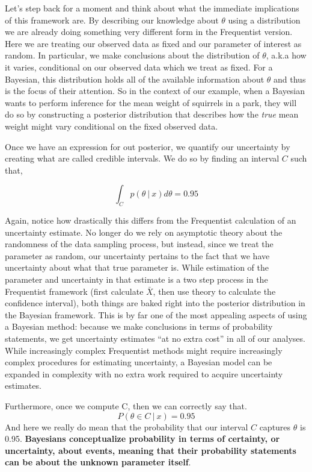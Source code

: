 \documentclass[12pt,twoside]{reedthesis}
\begin{document}
Let's step back for a moment and think about what the immediate implications of this framework are. By describing our knowledge about \(\theta\) using a distribution we are already doing something very different form in the Frequentist version. Here we are treating our observed data as fixed and our parameter of interest as random. In particular, we make conclusions about the distribution of \(\theta\), a.k.a how it varies, conditional on our observed data which we treat as fixed. For a Bayesian, this distribution holds all of the available information about \(\theta\) and thus is the focus of their attention. So in the context of our example, when a Bayesian wants to perform inference for the mean weight of squirrels in a park, they will do so by constructing a posterior distribution that describes how the \emph{true} mean weight might vary conditional on the fixed observed data.

Once we have an expression for out posterior, we quantify our uncertainty by creating what are called credible intervals. We do so by finding an interval \(C\) such that,

\[
\int_C p(\theta \ | \ x)d\theta = 0.95
\]

Again, notice how drastically this differs from the Frequentist calculation of an uncertainty estimate. No longer do we rely on asymptotic theory about the randomness of the data sampling process, but instead, since we treat the parameter as random, our uncertainty pertains to the fact that we have uncertainty about what that true parameter is. While estimation of the parameter and uncertainty in that estimate is a two step process in the Frequentist framework (first calculate \(\bar{X}\), then use theory to calculate the confidence interval), both things are baked right into the posterior distribution in the Bayesian framework. This is by far one of the most appealing aspects of using a Bayesian method: because we make conclusions in terms of probability statements, we get uncertainty estimates ``at no extra cost'' in all of our analyses. While increasingly complex Frequentist methods might require increasingly complex procedures for estimating uncertainty, a Bayesian model can be expanded in complexity with no extra work required to acquire uncertainty estimates.

Furthermore, once we compute C, then we can correctly say that.
\begin{equation}
  P(\theta \in C \ | \ x) = 0.95
  \label{eq:bayes-ci}
\end{equation}
And here we really do mean that the probability that our interval \(C\) captures \(\theta\) is 0.95. \textbf{Bayesians conceptualize probability in terms of certainty, or uncertainty, about events, meaning that their probability statements can be about the unknown parameter itself}.
\end{document}
